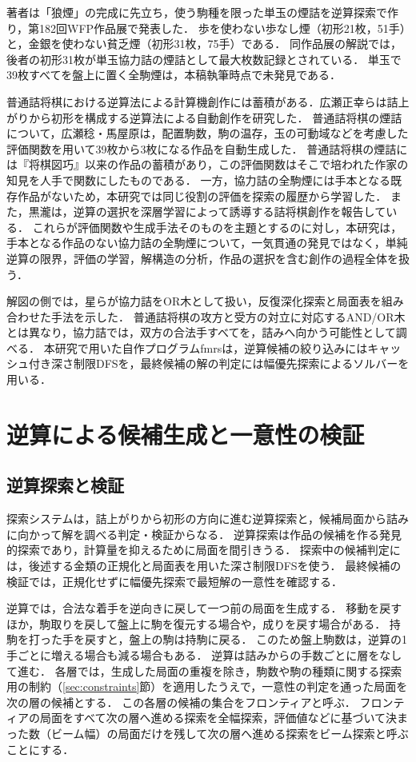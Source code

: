 \documentclass[english,submit]{ipsj}
\begin{document}
著者は「狼煙」の完成に先立ち，使う駒種を限った単玉の煙詰を逆算探索で作り，第182回WFP作品展で発表した\cite{wfp218}．
歩を使わない歩なし煙（初形21枚，51手）と，金銀を使わない貧乏煙（初形31枚，75手）である．
同作品展の解説では，後者の初形31枚が単玉協力詰の煙詰として最大枚数記録とされている\cite{wfp218}．
単玉で39枚すべてを盤上に置く全駒煙は，本稿執筆時点で未発見である．

普通詰将棋における逆算法による計算機創作には蓄積がある．広瀬正幸らは詰上がりから初形を構成する逆算法による自動創作を研究した\cite{hirose1998}．
普通詰将棋の煙詰について，広瀬稔・馬屋原は，配置駒数，駒の温存，玉の可動域などを考慮した評価関数を用いて39枚から3枚になる作品を自動生成した\cite{hirose2026}．
普通詰将棋の煙詰には『将棋図巧』以来の作品の蓄積があり，この評価関数はそこで培われた作家の知見を人手で関数にしたものである．
一方，協力詰の全駒煙には手本となる既存作品がないため，本研究では同じ役割の評価を探索の履歴から学習した．
また，黒瀧は，逆算の選択を深層学習によって誘導する詰将棋創作を報告している\cite{kurotaki2025}．
これらが評価関数や生成手法そのものを主題とするのに対し，本研究は，手本となる作品のない協力詰の全駒煙について，一気貫通の発見ではなく，単純逆算の限界，評価の学習，解構造の分析，作品の選択を含む創作の過程全体を扱う．

解図の側では，星らが協力詰をOR木として扱い，反復深化探索と局面表を組み合わせた手法を示した\cite{hoshi2002}．
普通詰将棋の攻方と受方の対立に対応するAND/OR木とは異なり，協力詰では，双方の合法手すべてを，詰みへ向かう可能性として調べる．
本研究で用いた自作プログラムfmrsは，逆算候補の絞り込みにはキャッシュ付き深さ制限DFSを，最終候補の解の判定には幅優先探索によるソルバーを用いる\cite{fmrs}．

\section{逆算による候補生成と一意性の検証}
\subsection{逆算探索と検証}
探索システムは，詰上がりから初形の方向に進む逆算探索と，候補局面から詰みに向かって解を調べる判定・検証からなる．
逆算探索は作品の候補を作る発見的探索であり，計算量を抑えるために局面を間引きうる．
探索中の候補判定には，後述する金類の正規化と局面表を用いた深さ制限DFSを使う．
最終候補の検証では，正規化せずに幅優先探索で最短解の一意性を確認する．

逆算では，合法な着手を逆向きに戻して一つ前の局面を生成する．
移動を戻すほか，駒取りを戻して盤上に駒を復元する場合や，成りを戻す場合がある．
持駒を打った手を戻すと，盤上の駒は持駒に戻る．
このため盤上駒数は，逆算の1手ごとに増える場合も減る場合もある．
逆算は詰みからの手数ごとに層をなして進む．
各層では，生成した局面の重複を除き，駒数や駒の種類に関する探索用の制約（\ref{sec:constraints}節）を適用したうえで，一意性の判定を通った局面を次の層の候補とする．
この各層の候補の集合をフロンティアと呼ぶ．
フロンティアの局面をすべて次の層へ進める探索を全幅探索，評価値などに基づいて決まった数（ビーム幅）の局面だけを残して次の層へ進める探索をビーム探索と呼ぶことにする．
\end{document}
